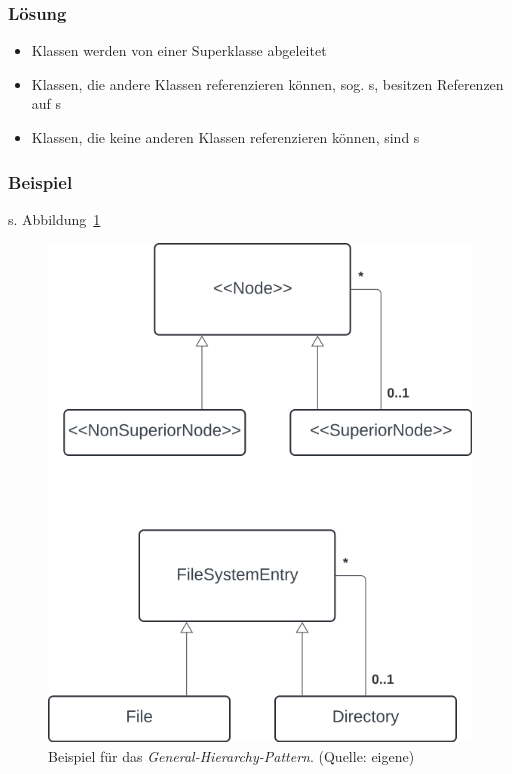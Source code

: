 \subsubsection*{Lösung}
\begin{itemize}
    \item Klassen werden von einer Superklasse  abgeleitet
    \item Klassen, die andere Klassen referenzieren können, sog. s, besitzen Referenzen auf s
    \item Klassen, die keine anderen Klassen referenzieren können, sind s
\end{itemize}

\subsubsection*{Beispiel}
s. Abbildung~\ref{fig:generalhierarchy}

\begin{figure}
    \centering
    \includegraphics[scale=0.4]{part two/Objektorientierte Analyse/img/generalhierarchy}
    \caption{Beispiel für das \textit{General-Hierarchy-Pattern}. (Quelle: eigene)}
    \label{fig:generalhierarchy}
\end{figure}


